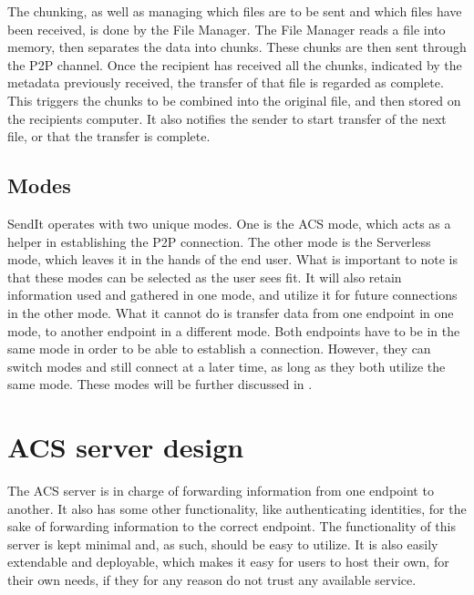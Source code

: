 		The chunking, as well as managing which files are to be sent and which files have been received, is done by the File Manager. The File Manager reads a file into memory, then separates the data into chunks. These chunks are then sent through the P2P channel. Once the recipient has received all the chunks, indicated by the metadata previously received, the transfer of that file is regarded as complete. This triggers the chunks to be combined into the original file, and then stored on the recipients computer. It also notifies the sender to start transfer of the next file, or that the transfer is complete.

	\subsection{Modes}
		SendIt operates with two unique modes. One is the ACS mode, which acts as a helper in establishing the P2P connection. The other mode is the Serverless mode, which leaves it in the hands of the end user. What is important to note is that these modes can be selected as the user sees fit. It will also retain information used and gathered in one mode, and utilize it for future connections in the other mode. What it cannot do is transfer data from one endpoint in one mode, to another endpoint in a different mode. Both endpoints have to be in the same mode in order to be able to establish a connection. However, they can switch modes and still connect at a later time, as long as they both utilize the same mode. These modes will be further discussed in .

\section{ACS server design}
	\label{sec:acs_serv_des}
	The ACS server is in charge of forwarding information from one endpoint to another. It also has some other functionality, like authenticating identities, for the sake of forwarding information to the correct endpoint. The functionality of this server is kept minimal and, as such, should be easy to utilize. It is also easily extendable and deployable, which makes it easy for users to host their own, for their own needs, if they for any reason do not trust any available service.
%
